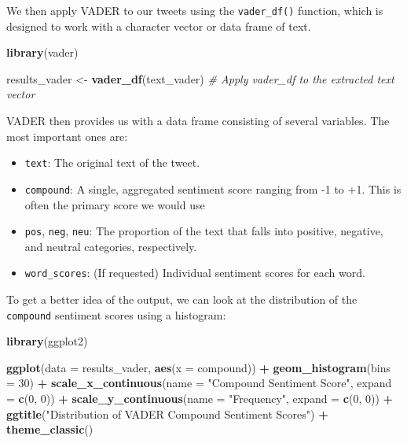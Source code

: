 \documentclass[
]{book}
\newenvironment{Shaded}{\begin{snugshade}}{\end{snugshade}}
\newcommand{\AttributeTok}[1]{\textcolor[rgb]{0.13,0.29,0.53}{#1}}
\newcommand{\CommentTok}[1]{\textcolor[rgb]{0.56,0.35,0.01}{\textit{#1}}}
\newcommand{\DecValTok}[1]{\textcolor[rgb]{0.00,0.00,0.81}{#1}}
\newcommand{\FunctionTok}[1]{\textcolor[rgb]{0.13,0.29,0.53}{\textbf{#1}}}
\newcommand{\NormalTok}[1]{#1}
\newcommand{\OtherTok}[1]{\textcolor[rgb]{0.56,0.35,0.01}{#1}}
\newcommand{\SpecialCharTok}[1]{\textcolor[rgb]{0.81,0.36,0.00}{\textbf{#1}}}
\newcommand{\StringTok}[1]{\textcolor[rgb]{0.31,0.60,0.02}{#1}}
\providecommand{\tightlist}{%
  \setlength{\itemsep}{0pt}\setlength{\parskip}{0pt}}
\begin{document}
We then apply VADER to our tweets using the \texttt{vader\_df()} function, which is designed to work with a character vector or data frame of text.

\begin{Shaded}
\begin{Highlighting}[]
\FunctionTok{library}\NormalTok{(vader)}

\NormalTok{results\_vader }\OtherTok{\textless{}{-}} \FunctionTok{vader\_df}\NormalTok{(text\_vader)  }\CommentTok{\# Apply vader\_df to the extracted text vector}
\end{Highlighting}
\end{Shaded}

VADER then provides us with a data frame consisting of several variables. The most important ones are:

\begin{itemize}
\tightlist
\item
  \texttt{text}: The original text of the tweet.
\item
  \texttt{compound}: A single, aggregated sentiment score ranging from -1 to +1. This is often the primary score we would use
\item
  \texttt{pos}, \texttt{neg}, \texttt{neu}: The proportion of the text that falls into positive, negative, and neutral categories, respectively.
\item
  \texttt{word\_scores}: (If requested) Individual sentiment scores for each word.
\end{itemize}

To get a better idea of the output, we can look at the distribution of the \texttt{compound} sentiment scores using a histogram:

\begin{Shaded}
\begin{Highlighting}[]
\FunctionTok{library}\NormalTok{(ggplot2)}

\FunctionTok{ggplot}\NormalTok{(}\AttributeTok{data =}\NormalTok{ results\_vader, }\FunctionTok{aes}\NormalTok{(}\AttributeTok{x =}\NormalTok{ compound)) }\SpecialCharTok{+} \FunctionTok{geom\_histogram}\NormalTok{(}\AttributeTok{bins =} \DecValTok{30}\NormalTok{) }\SpecialCharTok{+} \FunctionTok{scale\_x\_continuous}\NormalTok{(}\AttributeTok{name =} \StringTok{"Compound Sentiment Score"}\NormalTok{,}
    \AttributeTok{expand =} \FunctionTok{c}\NormalTok{(}\DecValTok{0}\NormalTok{, }\DecValTok{0}\NormalTok{)) }\SpecialCharTok{+} \FunctionTok{scale\_y\_continuous}\NormalTok{(}\AttributeTok{name =} \StringTok{"Frequency"}\NormalTok{, }\AttributeTok{expand =} \FunctionTok{c}\NormalTok{(}\DecValTok{0}\NormalTok{, }\DecValTok{0}\NormalTok{)) }\SpecialCharTok{+}
    \FunctionTok{ggtitle}\NormalTok{(}\StringTok{"Distribution of VADER Compound Sentiment Scores"}\NormalTok{) }\SpecialCharTok{+} \FunctionTok{theme\_classic}\NormalTok{()}
\end{Highlighting}
\end{Shaded}
\end{document}
